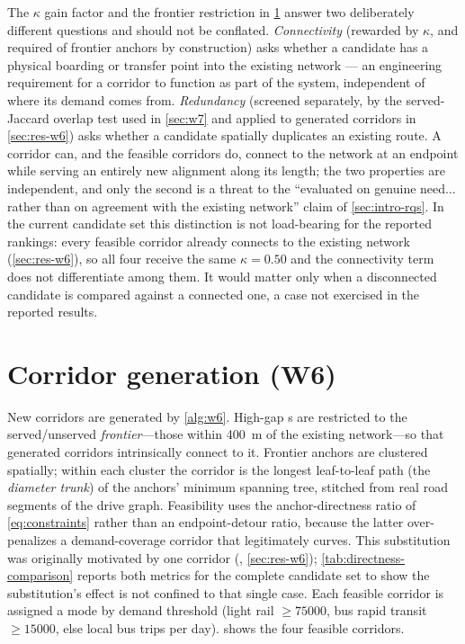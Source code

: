 The $\kappa$ gain factor and the frontier restriction in \cref{sec:w6} answer two
deliberately different questions and should not be conflated. \emph{Connectivity}
(rewarded by $\kappa$, and required of frontier anchors by construction) asks whether a
candidate has a physical boarding or transfer point into the existing network --- an
engineering requirement for a corridor to function as part of the system, independent of
where its demand comes from. \emph{Redundancy} (screened separately, by the served-\ageb
Jaccard overlap test used in \cref{sec:w7} and applied to generated corridors in
\cref{sec:res-w6}) asks whether a candidate spatially duplicates an existing route. A
corridor can, and the feasible \zmg corridors do, connect to the network at an endpoint
while serving an entirely new alignment along its length; the two properties are
independent, and only the second is a threat to the ``evaluated on genuine need... rather
than on agreement with the existing network'' claim of \cref{sec:intro-rqs}. In the current
candidate set this distinction is not load-bearing for the reported rankings: every
feasible \zmg corridor already connects to the existing network (\cref{sec:res-w6}), so all
four receive the same $\kappa=0.50$ and the connectivity term does not differentiate among
them. It would matter only when a disconnected candidate is compared against a connected
one, a case not exercised in the reported results.

\section{Corridor generation (W6)}
\label{sec:w6}

New corridors are generated by \cref{alg:w6}. High-gap \ageb{}s are restricted to
the served/unserved \emph{frontier}---those within \SI{400}{\metre} of the existing
network---so that generated corridors intrinsically connect to it. Frontier anchors
are clustered spatially; within each cluster the corridor is the longest
leaf-to-leaf path (the \emph{diameter trunk}) of the anchors' minimum spanning tree,
stitched from real road segments of the drive graph. Feasibility uses the
anchor-directness ratio of \cref{eq:constraints} rather than an endpoint-detour
ratio, because the latter over-penalizes a demand-coverage corridor that
legitimately curves. This substitution was originally motivated by one corridor
(, \cref{sec:res-w6}); \cref{tab:directness-comparison} reports both
metrics for the complete candidate set to show the substitution's effect is not
confined to that single case. Each feasible corridor is assigned a mode by demand threshold
(light rail $\ge \num{75000}$, bus rapid transit $\ge \num{15000}$, else local bus
trips per day).  shows the four feasible \zmg corridors.

